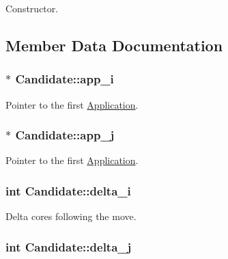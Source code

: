 Constructor. 



\subsection{Member Data Documentation}
\hypertarget{classCandidate_a1bfed0429bba41f57dce0fbd37225c2c}{
\subsubsection[{app\-\_\-i}]{$\ast$ Candidate\-::app\-\_\-i}}\label{classCandidate_a1bfed0429bba41f57dce0fbd37225c2c}


Pointer to the first \hyperlink{classApplication}{Application}. 

\hypertarget{classCandidate_a8b0f26e8b45e9a3331be8a9694d3be5e}{
\subsubsection[{app\-\_\-j}]{$\ast$ Candidate\-::app\-\_\-j}}\label{classCandidate_a8b0f26e8b45e9a3331be8a9694d3be5e}


Pointer to the first \hyperlink{classApplication}{Application}. 

\hypertarget{classCandidate_ab1033e1f3e0060f0773c7d9268c2ce0b}{
\subsubsection[{delta\-\_\-i}]{\setlength{\rightskip}{0pt plus 5cm}int Candidate\-::delta\-\_\-i}}\label{classCandidate_ab1033e1f3e0060f0773c7d9268c2ce0b}


Delta cores following the move. 

\hypertarget{classCandidate_a02528143e2448bfcad797aae2fe1ac90}{
\subsubsection[{delta\-\_\-j}]{\setlength{\rightskip}{0pt plus 5cm}int Candidate\-::delta\-\_\-j}}\label{classCandidate_a02528143e2448bfcad797aae2fe1ac90}


